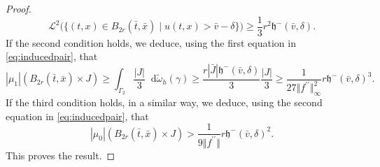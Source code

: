 \documentclass[11pt, twoside, reqno]{amsart}
\theoremstyle{definition}
\theoremstyle{remark}
\numberwithin{equation}{section}
\newcommand*\dif{\mathop{}\!\mathrm{d}}
\newcommand{\second}{{\prime \prime}}
\newcommand{\msc}[1]{\mathscr{#1}}
\begin{document}
\begin{proof}
$$
\msc L^2\Big( \big\{    (t, x) \in B_{2r}(\bar t, \bar x) \; \big| \;  u(t, x) > \bar v- \delta \big\} \Big) \geq \frac{1}{3}r^2 \mathfrak h^-(\bar v, \delta).
$$
If the second condition holds,  we deduce, using the first equation in \eqref{eq:inducedpair}, that
$$
|\mu_1|(B_{2r}(\bar t, \bar x) \times J ) \geq \int_{\Gamma_2} \frac{|J|}{3}\dif \tilde \omega_h(\gamma) \geq \frac{r|\bar J| \mathfrak h^-(\bar v, \delta)}{3}\frac{|J|}{3} \geq \frac{1}{27 \Vert f^{\second} \Vert_{\infty}^2} r \mathfrak h^-(\bar v, \delta)^3.
$$
If the third condition holds, in a similar way, we deduce, using the second equation in \eqref{eq:inducedpair}, that 
$$
|\mu_0|(B_{2r}(\bar t, \bar x) \times J ) > \frac{1}{9\Vert f^{\second} \Vert} r \mathfrak h^-(\bar v, \delta)^2.
$$
This proves the result.
\end{proof}
\end{document}
